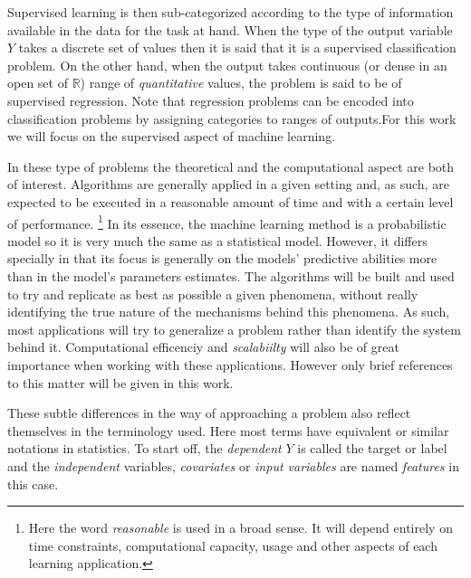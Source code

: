 Supervised learning is then sub-categorized according to the type of information available in the data for the task at hand. When the type of the output variable $Y$ takes a discrete set of values then it is said that it is a supervised classification problem. On the other hand, when the output takes continuous (or dense in an open set of $\mathbb{R}$) range of \textit{quantitative} values, the problem is said to be of supervised regression. Note that regression problems can be encoded into classification problems by assigning categories to ranges of outputs.For this work we will focus on the supervised aspect of machine learning.

In these type of problems the theoretical and the computational aspect are both of interest. Algorithms are generally applied in a given setting and, as such, are expected to be executed in a reasonable amount of time and with a certain level of performance. \footnote{Here the word \textit{reasonable} is used in a broad sense. It will depend entirely on time constraints, computational capacity, usage and other aspects of each learning application.} In its essence, the machine learning method is a probabilistic model so it is very much the same as a statistical model. However, it differs specially in that its focus is generally on the models' predictive abilities more than in the model's parameters estimates.\cite{breiman-statisticalmodeling} The algorithms will be built and used to try and replicate as best as possible a given phenomena, without really identifying the true nature of the mechanisms behind this phenomena. As such, most applications will try to generalize a problem rather than identify the system behind it. Computational efficenciy and \textit{scalabiilty} will also be of great importance when working with these applications. However only brief references to this matter will be given in this work.


These subtle differences in the way of approaching a problem also reflect themselves in the terminology used. Here most terms have equivalent or similar notations in statistics. To start off, the \textit{dependent} $Y$ is called the target or label and the \textit{independent} variables, \textit{covariates} or \textit{input variables} are named \textit{features} in this case. 


